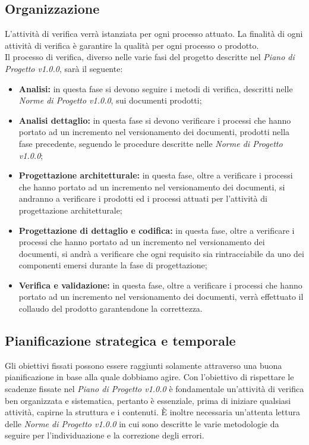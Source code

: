 \subsection{Organizzazione}
L'attività di verifica verrà istanziata per ogni processo attuato. La finalità di ogni attività di verifica è garantire la qualità per ogni processo o prodotto.\\
Il processo di verifica, diverso nelle varie fasi del progetto descritte nel \textit{Piano di Progetto v1.0.0}, sarà il seguente:
\begin{itemize}
	\item \textbf{Analisi:} in questa fase si devono seguire i metodi di verifica, descritti nelle \textit{Norme di Progetto v1.0.0}, sui documenti prodotti;
	\item \textbf{Analisi dettaglio:} in questa fase si devono verificare i processi che hanno portato ad un incremento nel versionamento dei documenti, prodotti nella fase precedente, seguendo le procedure descritte nelle \textit{Norme di Progetto v1.0.0};
	\item \textbf{Progettazione architetturale:} in questa fase, oltre a verificare i processi che hanno portato ad un incremento nel versionamento dei documenti, si andranno a verificare i prodotti ed i processi attuati per l'attività di progettazione architetturale;
	\item \textbf{Progettazione di dettaglio e codifica:} in questa fase, oltre a verificare i processi che hanno portato ad un incremento nel versionamento dei documenti, si andrà a verificare che ogni requisito sia rintracciabile da uno dei componenti emersi durante la fase di progettazione;
	\item \textbf{Verifica e validazione:} in questa fase, oltre a verificare i processi che hanno portato ad un incremento nel versionamento dei documenti, verrà effettuato il collaudo del prodotto garantendone la correttezza.
\end{itemize} 

\subsection{Pianificazione strategica e temporale}
Gli obiettivi fissati possono essere raggiunti solamente attraverso una buona pianificazione in base alla quale dobbiamo agire. Con l'obiettivo di rispettare le scadenze fissate nel \textit{Piano di Progetto v1.0.0} è fondamentale un'attività di verifica ben organizzata e sistematica, pertanto è essenziale, prima di iniziare qualsiasi attività, capirne la struttura e i contenuti. È inoltre necessaria un'attenta lettura delle \textit{Norme di Progetto v1.0.0} in cui sono descritte le varie metodologie da seguire per l'individuazione e la correzione degli errori.

